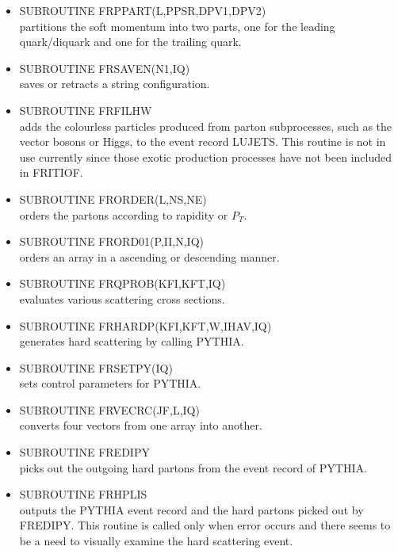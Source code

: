 \begin{itemize}
\item  SUBROUTINE FRPPART(L,PPSR,DPV1,DPV2) \\
 partitions the soft momentum into two parts, one for
 the leading quark/diquark and one for the trailing quark.

\item  SUBROUTINE FRSAVEN(N1,IQ) \\
 saves or retracts a string configuration.  

\item  SUBROUTINE FRFILHW \\
 adds the colourless particles produced from parton subprocesses, such as the
 vector bosons or Higgs, to the event record LUJETS.  This routine is
 not in use currently since those exotic production processes 
 have not been included in FRITIOF.  

\item  SUBROUTINE FRORDER(L,NS,NE) \\
 orders the partons according to rapidity or $P_T$.

\item  SUBROUTINE FRORD01(P,II,N,IQ) \\
 orders an array in a ascending or descending manner.  

\item  SUBROUTINE FRQPROB(KFI,KFT,IQ) \\
 evaluates various scattering cross sections.   

\item  SUBROUTINE FRHARDP(KFI,KFT,W,IHAV,IQ) \\
 generates hard scattering by calling PYTHIA.

\item  SUBROUTINE FRSETPY(IQ) \\
 sets control parameters for PYTHIA.

\item  SUBROUTINE FRVECRC(JF,L,IQ) \\
 converts four vectors from one array into another.

\item  SUBROUTINE FREDIPY \\
 picks out the outgoing hard partons from the event record of PYTHIA.

\item  SUBROUTINE FRHPLIS \\
 outputs the PYTHIA event record and the hard partons picked out by FREDIPY.
 This routine is called only when error occurs and there seems to be a need
 to visually examine the hard scattering event.


\end{itemize}
